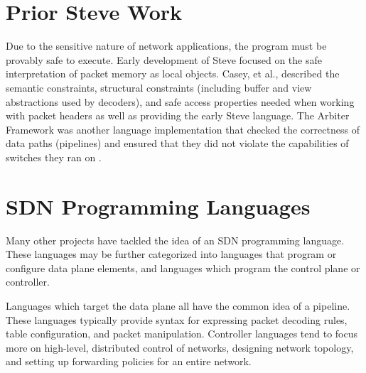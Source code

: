 

\section{Prior Steve Work}

Due to the sensitive nature of network applications, the program must be provably safe to execute.
Early development of Steve focused on the safe interpretation of packet memory as local objects.
Casey, et al., described the semantic constraints,
structural constraints (including buffer and view abstractions used by decoders), and 
safe access properties needed when working with packet headers as well as providing the early Steve language.
The Arbiter Framework was another language implementation that checked the correctness of data paths (pipelines) and ensured that they did not violate the 
capabilities of switches they ran on
\cite{arbiter}.

\section{SDN Programming Languages}

Many other projects have tackled the idea of an SDN programming language.
These languages may be further categorized into languages that program or configure
data plane elements, and languages which program the control plane or controller.

Languages which target the data plane all have the common idea of a pipeline.
These languages typically provide syntax for expressing packet decoding rules, table configuration,
and packet manipulation.
Controller languages tend to focus more on high-level, distributed control
of networks, designing network topology, and setting up forwarding policies
for an entire network.

